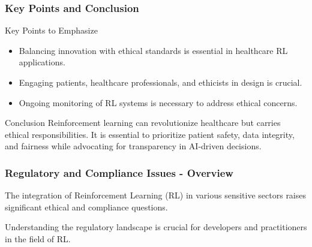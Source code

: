 \documentclass{beamer}
\begin{document}
\begin{frame}[fragile]
    \frametitle{Key Points and Conclusion}
    \begin{block}{Key Points to Emphasize}
        \begin{itemize}
            \item Balancing innovation with ethical standards is essential in healthcare RL applications.
            \item Engaging patients, healthcare professionals, and ethicists in design is crucial.
            \item Ongoing monitoring of RL systems is necessary to address ethical concerns.
        \end{itemize}
    \end{block}
    \begin{block}{Conclusion}
        Reinforcement learning can revolutionize healthcare but carries ethical responsibilities. It is essential to prioritize patient safety, data integrity, and fairness while advocating for transparency in AI-driven decisions.
    \end{block}
\end{frame}

\begin{frame}[fragile]
    \frametitle{Regulatory and Compliance Issues - Overview}
    The integration of Reinforcement Learning (RL) in various sensitive sectors raises significant ethical and compliance questions.
    
    Understanding the regulatory landscape is crucial for developers and practitioners in the field of RL.
\end{frame}
\end{document}
